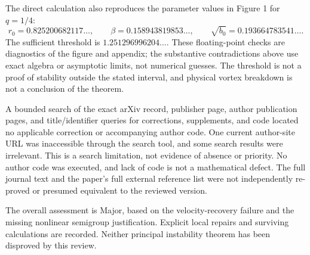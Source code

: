 \documentclass[10pt]{article}
\begin{document}
The direct calculation also reproduces the parameter values in Figure 1 for \(q=1/4\): \[r_0=0.825200682117\ldots,\qquad
 \beta=0.158943819853\ldots,\qquad
 \sqrt{b_0}=0.193664783541\ldots.\] The sufficient threshold is \(1.251296996204\ldots\). These floating-point checks are diagnostics of the figure and appendix; the substantive contradictions above use exact algebra or asymptotic limits, not numerical guesses. The threshold is not a proof of stability outside the stated interval, and physical vortex breakdown is not a conclusion of the theorem.\par
A bounded search of the exact arXiv record, publisher page, author publication pages, and title/identifier queries for corrections, supplements, and code located no applicable correction or accompanying author code. One current author-site URL was inaccessible through the search tool, and some search results were irrelevant. This is a search limitation, not evidence of absence or priority. No author code was executed, and lack of code is not a mathematical defect. The full journal text and the paper’s full external reference list were not independently re-proved or presumed equivalent to the reviewed version.\par
The overall assessment is Major, based on the velocity-recovery failure and the missing nonlinear semigroup justification. Explicit local repairs and surviving calculations are recorded. Neither principal instability theorem has been disproved by this review.\par
\end{document}

